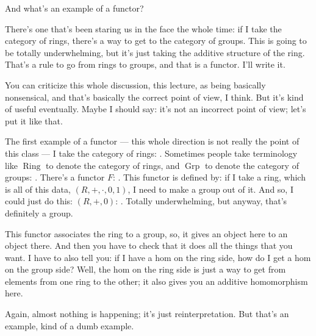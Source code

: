 \begin{speech}[01:25:22 - 01:27:44]
And what's an example of a functor? 

There's one that's been staring us in the face the whole time: if I take the category of rings, there's a way to get to the category of groups. This is going to be totally underwhelming, but it's just taking the additive structure of the ring. That's a rule to go from rings to groups, and that is a functor. I'll write it.

You can criticize this whole discussion, this lecture, as being basically nonsensical, and that's basically the correct point of view, I think. But it's kind of useful eventually. Maybe I should say: it's not an incorrect point of view; let's put it like that.

The first example of a functor --- this whole direction is not really the point of this class --- I take the category of rings: . Sometimes people take terminology like $\operatorname{Ring}$ to denote the category of rings,  and $\operatorname{Grp}$ to denote the category of groups: . There's a functor $F$: . This functor is defined by: if I take a ring, which is all of this data, $(R, +, \cdot, 0, 1)$,  I need to make a group out of it. And so, I could just do this: $(R, +, 0)$: . Totally underwhelming, but anyway, that's definitely a group.

This functor associates the ring to a group, so, it gives an object here to an object there. And then you have to check that it does all the things that you want. I have to also tell you: if I have a hom on the ring side, how do I get a hom on the group side? Well, the hom on the ring side is just a way to get from elements from one ring to the other; it also gives you an additive homomorphism here.

Again, almost nothing is happening; it's just reinterpretation. But that's an example, kind of a dumb example.
\end{speech}

